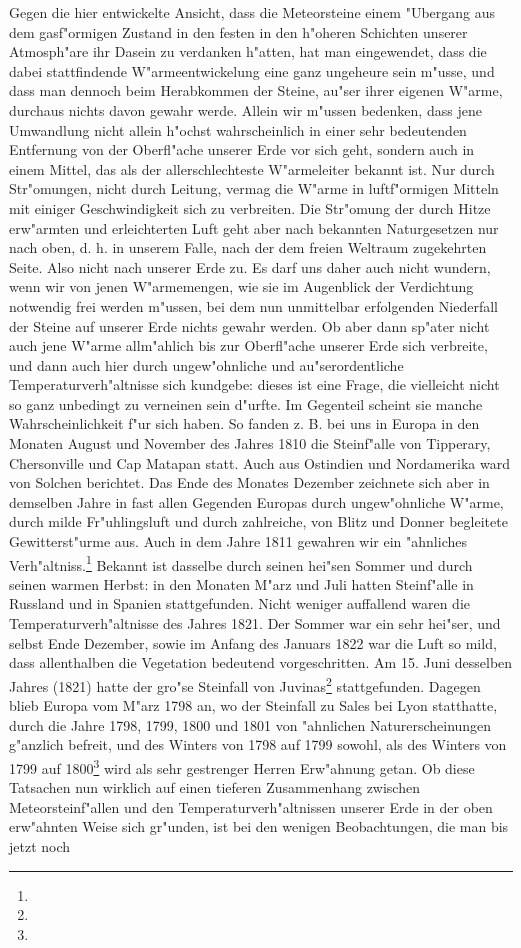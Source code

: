 \documentclass[a4paper, 8pt, oneside, polutonikogreek, german]{article}
\begin{document}
Gegen die hier entwickelte Ansicht, dass die Meteorsteine einem "Ubergang aus dem gasf"ormigen Zustand in den festen in den h"oheren Schichten unserer Atmosph"are ihr Dasein zu verdanken h"atten, hat man eingewendet, dass die dabei stattfindende W"armeentwickelung eine ganz ungeheure sein m"usse, und dass man dennoch beim Herabkommen der Steine, au"ser ihrer eigenen W"arme, durchaus nichts davon gewahr werde. Allein wir m"ussen bedenken, dass jene Umwandlung nicht allein h"ochst wahrscheinlich in einer sehr bedeutenden Entfernung von der Oberfl"ache unserer Erde vor sich geht, sondern auch in einem Mittel, das als der allerschlechteste W"armeleiter bekannt ist. Nur durch Str"omungen, nicht durch Leitung, vermag die W"arme in luftf"ormigen Mitteln mit einiger Geschwindigkeit sich zu verbreiten. Die Str"omung der durch Hitze erw"armten und erleichterten Luft geht aber nach bekannten Naturgesetzen nur nach oben, d. h. in unserem Falle, nach der dem freien Weltraum zugekehrten Seite. Also nicht nach unserer Erde zu. Es darf uns daher auch nicht wundern, wenn wir von jenen W"armemengen, wie sie im Augenblick der Verdichtung notwendig frei werden m"ussen, bei dem nun unmittelbar erfolgenden Niederfall der Steine auf unserer Erde nichts gewahr werden. Ob aber dann sp"ater nicht auch jene W"arme allm"ahlich bis zur Oberfl"ache unserer Erde sich verbreite, und dann auch hier durch ungew"ohnliche und au"serordentliche Temperaturverh"altnisse sich kundgebe: dieses ist eine Frage, die vielleicht nicht so ganz unbedingt zu verneinen sein d"urfte. Im Gegenteil scheint sie manche Wahrscheinlichkeit f"ur sich haben. So fanden z. B. bei uns in Europa in den Monaten August und November des Jahres 1810 die Steinf"alle von Tipperary, Chersonville und Cap Matapan statt. Auch aus Ostindien und Nordamerika ward von Solchen berichtet. Das Ende des Monates Dezember zeichnete sich aber in demselben Jahre in fast allen Gegenden Europas durch ungew"ohnliche W"arme, durch milde Fr"uhlingsluft und durch zahlreiche, von Blitz und Donner begleitete Gewitterst"urme aus. Auch in dem Jahre 1811 gewahren wir ein "ahnliches Verh"altniss.\footnote{} Bekannt ist dasselbe durch seinen hei"sen Sommer und durch seinen warmen Herbst: in den Monaten M"arz und Juli hatten Steinf"alle in Russland und in Spanien stattgefunden. Nicht weniger auffallend waren die Temperaturverh"altnisse des Jahres 1821. Der Sommer war ein sehr hei"ser, und selbst Ende Dezember, sowie im Anfang des Januars 1822 war die Luft so mild, dass allenthalben die Vegetation bedeutend vorgeschritten. Am 15. Juni desselben Jahres (1821) hatte der gro"se Steinfall von Juvinas\footnote{} stattgefunden. Dagegen blieb Europa vom M"arz 1798 an, wo der Steinfall zu Sales bei Lyon statthatte, durch die Jahre 1798, 1799, 1800 und 1801 von "ahnlichen Naturerscheinungen g"anzlich befreit, und des Winters von 1798 auf 1799 sowohl, als des Winters von 1799 auf 1800\footnote{} wird als sehr gestrenger Herren Erw"ahnung getan. Ob diese Tatsachen nun wirklich auf einen tieferen Zusammenhang zwischen Meteorsteinf"allen und den Temperaturverh"altnissen unserer Erde in der oben erw"ahnten Weise sich gr"unden, ist bei den wenigen Beobachtungen, die man bis jetzt noch 
\end{document}
